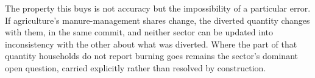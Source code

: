 The property this buys is not accuracy but the impossibility of a particular error. If
agriculture's manure-management shares change, the diverted quantity changes with them,
in the same commit, and neither sector can be updated into inconsistency with the other
about what was diverted. Where the part of that quantity households do not report
burning goes
remains the sector's dominant open question, carried explicitly rather than resolved by
construction.
